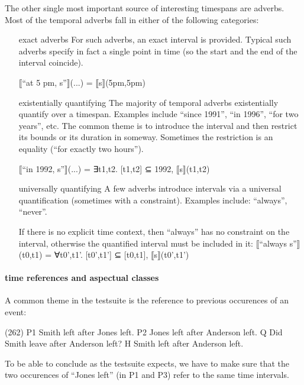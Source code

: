 \documentclass[a4paper,11pt]{article}
\begin{document}
The other single most important source of interesting timespans are
adverbs. Most of the temporal adverbs fall in either of the following
categories:

\begin{enumerate}
\item[exact adverbs] For such adverbs, an exact interval is
  provided. Typical such adverbs specify in fact a single point in
  time (so the start and the end of the interval coincide).

  ⟦``at 5 pm, s''⟧(...) = ⟦s⟧(5pm,5pm)

\item[existentially quantifying] The majority of temporal adverbs
  existentially quantify over a timespan. Examples include ``since
  1991'', ``in 1996'', ``for two years'', etc. The common theme is to
  introduce the interval and then restrict its bounds or its duration
  in someway. Sometimes the restriction is an equality (``for exactly
  two hours'').

  ⟦``in 1992, s''⟧(...) = ∃t1,t2.  [t1,t2] ⊆ 1992, ⟦s⟧(t1,t2)

\item[universally quantifying] A few adverbs introduce intervals via a
  universal quantification (sometimes with a constraint). Examples
  include: ``always'', ``never''.

  If there is no explicit time context, then ``always'' has no
  constraint on the interval, otherwise the quantified interval must
  be included in it:
  ⟦``always s''⟧(t0,t1) = ∀t0',t1'. [t0',t1'] ⊆ [t0,t1], ⟦s⟧(t0',t1')


\end{enumerate}


\paragraph{time references and aspectual classes}

A common theme in the testsuite is the reference to previous
occurences of an event:

(262)
P1	Smith left after Jones left.
P2	Jones left after Anderson left.
Q 	Did Smith leave after Anderson left?
H 	Smith left after Anderson left.

To be able to conclude as the testsuite expects, we have to make sure
that the two occurences of ``Jones left'' (in P1 and P3) refer to the
same time intervals.
\end{document}
